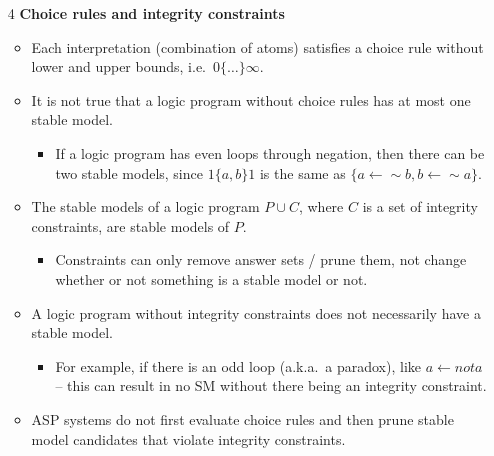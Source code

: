 \documentclass[9pt,a4paper,landscape]{article}
\begin{document}
{\begin{itemize}
	\item[4] \textbf{Choice rules and integrity constraints}
	\begin{itemize}[noitemsep]
		\item Each interpretation (combination of atoms) satisfies a choice rule without lower and upper bounds, i.e.\ $0 \{ \ldots \} \infty$.
		\item It is not true that a logic program without choice rules has at most one stable model.
		\begin{itemize}[noitemsep]
			\item If a logic program has even loops through negation, then there can be two stable models, since $1\{a, b\}1$ is the same as $\{a \leftarrow \sim b, b \leftarrow \sim a\}$.
		\end{itemize} 
		\item The stable models of a logic program $P \cup C$, where $C$ is a set of integrity constraints, are stable models of $P$.
		\begin{itemize}[noitemsep]
			\item Constraints can only remove answer sets / prune them, not change whether or not something is a stable model or not.
		\end{itemize}
		\item A logic program without integrity constraints does not necessarily have a stable model.
		\begin{itemize}[noitemsep]
			\item For example, if there is an odd loop (a.k.a.\ a paradox), like $a \leftarrow not a$ -- this can result in no SM without there being an integrity constraint.
		\end{itemize}
		\item ASP systems do not first evaluate choice rules and then prune stable model candidates that violate integrity constraints.
	\end{itemize}
	

\end{itemize}}
\end{document}
